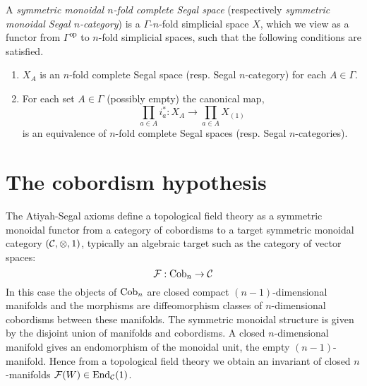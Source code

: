\documentclass[a4paper]{amsart}
\begin{document}
\begin{definition}
	A {\em symmetric monoidal $n$-fold complete Segal space} (respectively {\em symmetric monoidal Segal $n$-category}) is a $\Gamma$-$n$-fold simplicial space $X$, which we view as a functor from $\Gamma^\textrm{op}$ to $n$-fold simplicial spaces, such that the following conditions are satisfied. 
	\begin{enumerate}
		\item $X_A$ is an $n$-fold complete Segal space (resp. Segal $n$-category) for each $A \in \Gamma$. 
		\item For each set $A \in \Gamma$ (possibly empty) the canonical map,
		\begin{equation*}
			\prod_{a \in A} i_a^*: X_A \to \prod_{a \in A} X_{(1)}
		\end{equation*}
		is an equivalence of $n$-fold complete Segal spaces (resp. Segal $n$-categories). 
	\end{enumerate}
\end{definition}



\section{The cobordism hypothesis} \label{app:ch}


The Atiyah-Segal axioms define a topological field theory as a symmetric monoidal functor from a category of cobordisms to a target symmetric monoidal category $(\mathcal C, \otimes, 1)$, typically an algebraic target such as the category of vector spaces: 
\begin{equation*}
	\mathcal F: \mathrm{Cob}_n \to \mathcal C
\end{equation*}
In this case the objects of $\mathrm{Cob}_n$ are closed compact $(n-1)$-dimensional manifolds and the morphisms are diffeomorphism classes of $n$-dimensional cobordisms between these manifolds. The symmetric monoidal structure is given by the disjoint union of manifolds and cobordisms. A closed $n$-dimensional manifold gives an endomorphism of the monoidal unit, the empty $(n-1)$-manifold. Hence from a topological field theory we obtain an invariant of closed $n$-manifolds $\mathcal F(W) \in \operatorname{End}_{\mathcal C}(1)$.  
\end{document}
